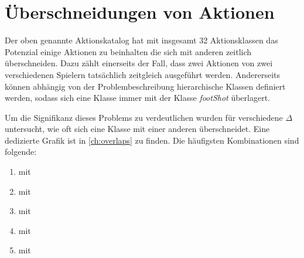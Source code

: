 \section{Überschneidungen von Aktionen}
\label{sec:multi-label}

Der oben genannte Aktionskatalog hat mit insgesamt 32 Aktionsklassen das Potenzial einige Aktionen zu beinhalten die sich mit anderen zeitlich überschneiden.
Dazu zählt einerseits der Fall, dass zwei Aktionen von zwei verschiedenen Spielern tatsächlich zeitgleich ausgeführt werden.
Andererseits können abhängig von der Problembeschreibung \zB hierarchische Klassen definiert werden, sodass sich eine Klasse  immer mit der Klasse \emph{footShot} überlagert.

Um die Signifikanz dieses Problems zu verdeutlichen wurden für verschiedene $\Delta$ untersucht, wie oft sich eine Klasse mit einer anderen überschneidet.
Eine dedizierte Grafik ist in \autoref{ch:overlaps} zu finden.
Die häufigsten Kombinationen sind folgende:

\begin{enumerate}
    \item {} mit 
    \item {} mit 
    \item {} mit 
    \item {} mit 
    \item {} mit 
\end{enumerate}

